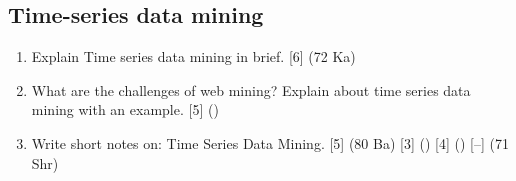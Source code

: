 \documentclass[12pt]{article}
\begin{document}
  \subsection{Time-series data mining}
    \begin{enumerate}[topsep=0pt, noitemsep]
      \item Explain Time series data mining in brief. \hfill [6] (72 Ka)

      \item What are the challenges of web mining? Explain about time series data mining with an example. \hfill [5] ()

      \item Write short notes on: Time Series Data Mining. \hfill [5] (80 Ba) [3] () [4] () [--] (71 Shr)
    \end{enumerate}
\end{document}
